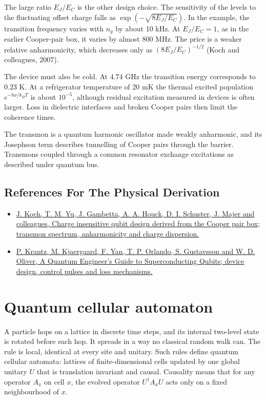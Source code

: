 \documentclass[11pt,oneside]{book}
\begin{document}
The large ratio \(E_J/E_C\) is the other design choice. The sensitivity of the levels to the fluctuating offset charge falls as \(\exp(-\sqrt{8E_J/E_C})\). In the example, the transition frequency varies with \(n_g\) by about 10 kHz. At \(E_J/E_C=1\), as in the earlier Cooper-pair box, it varies by almost 800 MHz. The price is a weaker relative anharmonicity, which decreases only as \((8E_J/E_C)^{-1/2}\) (Koch and colleagues, 2007).

The device must also be cold. At \(4.74\) GHz the transition energy corresponds to \(0.23\) K. At a refrigerator temperature of 20 mK the thermal excited population \(e^{-h\nu/k_BT}\) is about \(10^{-5}\), although residual excitation measured in devices is often larger. Loss in dielectric interfaces and broken Cooper pairs then limit the coherence times.

The transmon is a quantum harmonic oscillator made weakly anharmonic, and its Josephson term describes tunnelling of Cooper pairs through the barrier. Transmons coupled through a common resonator exchange excitations as described under quantum bus.

\subsection*{References For The Physical Derivation}
\begin{itemize}
\item \href{https://arxiv.org/abs/cond-mat/0703002}{J. Koch, T. M. Yu, J. Gambetta, A. A. Houck, D. I. Schuster, J. Majer and colleagues, Charge insensitive qubit design derived from the Cooper pair box; transmon spectrum, anharmonicity and charge dispersion.}
\item \href{https://arxiv.org/abs/1904.06560}{P. Krantz, M. Kjaergaard, F. Yan, T. P. Orlando, S. Gustavsson and W. D. Oliver, A Quantum Engineer's Guide to Superconducting Qubits; device design, control pulses and loss mechanisms.}
\end{itemize}





\clearpage

\section{Quantum cellular automaton}

\label{topic:quantum-cellular-automaton}

A particle hops on a lattice in discrete time steps, and its internal two-level state is rotated before each hop. It spreads in a way no classical random walk can. The rule is local, identical at every site and unitary. Such rules define quantum cellular automata: lattices of finite-dimensional cells updated by one global unitary \(U\) that is translation invariant and causal. Causality means that for any operator \(A_x\) on cell \(x\), the evolved operator \(U^\dagger A_xU\) acts only on a fixed neighbourhood of \(x\).
\end{document}
